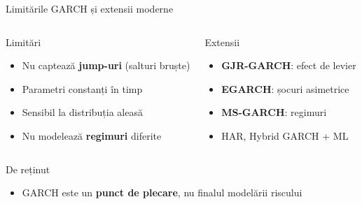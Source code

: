 \documentclass[9pt, aspectratio=169, t]{beamer}
\begin{document}
\begin{frame}{Limitările GARCH și extensii moderne}
    \vspace{-2mm}
    \begin{columns}[T]
        {\small
        \begin{alertblock}{Limitări}
            \begin{itemize}\setlength{\itemsep}{0pt}
                \item Nu captează \textbf{jump-uri} (salturi bruște)
                \item Parametri constanți în timp
                \item Sensibil la distribuția aleasă
                \item Nu modelează \textbf{regimuri} diferite
            \end{itemize}
        \end{alertblock}
        }

        {\small
        \begin{exampleblock}{Extensii}
            \begin{itemize}\setlength{\itemsep}{0pt}
                \item \textbf{GJR-GARCH}: efect de levier
                \item \textbf{EGARCH}: șocuri asimetrice
                \item \textbf{MS-GARCH}: regimuri
                \item HAR, Hybrid GARCH + ML
            \end{itemize}
        \end{exampleblock}
        }
    \end{columns}

    \vspace{0.15cm}

    \begin{block}{De reținut}
        \begin{itemize}\setlength{\itemsep}{0pt}
            \item GARCH este un \textbf{punct de plecare}, nu finalul modelării riscului
        \end{itemize}
    \end{block}
\end{frame}
\end{document}
